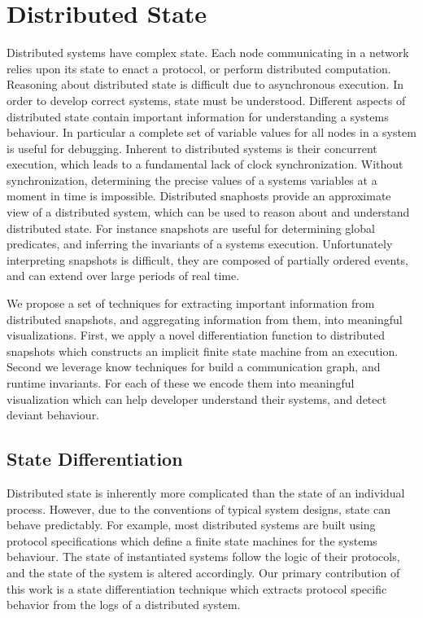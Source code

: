 \section{Distributed State}
\label{sec:distributed-state}


Distributed systems have complex state. Each node communicating in a network
relies upon its state to enact a protocol, or perform distributed computation.
Reasoning about distributed state is difficult due to asynchronous execution. In
order to develop correct systems, state must be understood. Different aspects of
distributed state contain important information for understanding a systems
behaviour. In particular a complete set of variable values for all nodes in a
system is useful for debugging. Inherent to distributed systems is their
concurrent execution, which leads to a fundamental lack of clock
synchronization. Without synchronization, determining the precise values of a
systems variables at a moment in time is impossible. Distributed snaphosts
provide an approximate view of a distributed system, which can be used to reason
about and understand distributed state. For instance snapshots are useful for
determining global predicates, and inferring the invariants of a systems
execution. Unfortunately interpreting snapshots is difficult, they are composed
of partially ordered events, and can extend over large periods of real time.

We propose a set of techniques for extracting important information from
distributed snapshots, and aggregating information from them, into meaningful
visualizations. First, we apply a novel differentiation function to distributed
snapshots which constructs an implicit finite state machine from an execution.
Second we leverage know techniques for build a communication graph, and runtime
invariants. For each of these we encode them into meaningful visualization
which can help developer understand their systems, and detect deviant
behaviour.

\subsection{State Differentiation}

Distributed state is inherently more complicated than the state of an
individual process. However, due to the conventions of typical system designs,
state can behave predictably. For example, most distributed systems are built
using protocol specifications which define a finite state machines for the
systems behaviour. The state of instantiated systems follow the logic of their
protocols, and the state of the system is altered accordingly. Our primary
contribution of this work is a state differentiation technique which extracts
protocol specific behavior from the logs of a distributed system.

